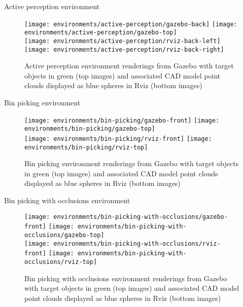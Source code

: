 \begin{frame}{Active perception environment}
	\begin{figure}
		\centering
		\texttt{[image: environments/active-perception/gazebo-back]}
		\texttt{[image: environments/active-perception/gazebo-top]}\\
		\texttt{[image: environments/active-perception/rviz-back-left]}
		\texttt{[image: environments/active-perception/rviz-back-right]}
		\caption{Active perception environment renderings from Gazebo with target objects in green (top images) and associated CAD model point clouds displayed as blue spheres in Rviz (bottom images)}
	\end{figure}
\end{frame}


\begin{frame}{Bin picking environment}
	\begin{figure}
		\centering
		\texttt{[image: environments/bin-picking/gazebo-front]}
		\texttt{[image: environments/bin-picking/gazebo-top]}\\
		\texttt{[image: environments/bin-picking/rviz-front]}
		\texttt{[image: environments/bin-picking/rviz-top]}
		\caption{Bin picking environment renderings from Gazebo with target objects in green (top images) and associated CAD model point clouds displayed as blue spheres in Rviz (bottom images)}
	\end{figure}
\end{frame}


\begin{frame}{Bin picking with occlusions environment}
	\begin{figure}
		\centering
		\texttt{[image: environments/bin-picking-with-occlusions/gazebo-front]}
		\texttt{[image: environments/bin-picking-with-occlusions/gazebo-top]}\\
		\texttt{[image: environments/bin-picking-with-occlusions/rviz-front]}
		\texttt{[image: environments/bin-picking-with-occlusions/rviz-top]}
		\caption{Bin picking with occlusions environment renderings from Gazebo with target objects in green (top images) and associated CAD model point clouds displayed as blue spheres in Rviz (bottom images)}
	\end{figure}
\end{frame}



